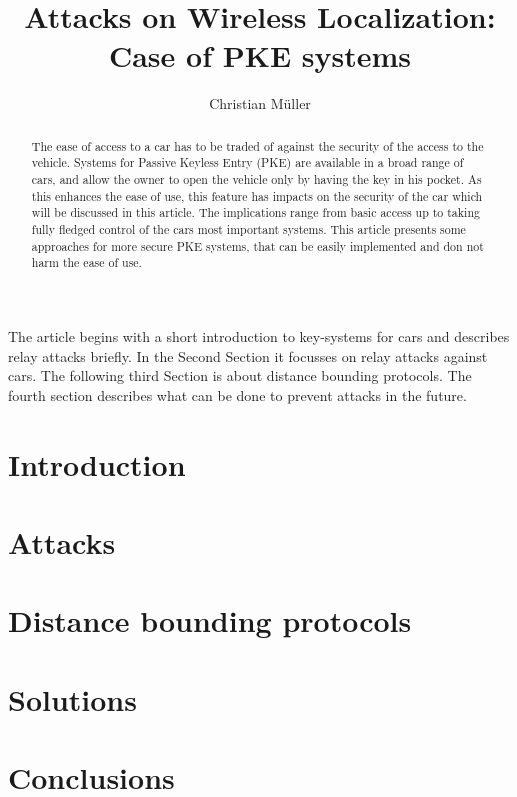 \documentclass[a4paper]{IEEEtran}
\title{Attacks on Wireless Localization:\\Case of PKE systems}
\author{Christian Müller}
\begin{document}
\maketitle

\setcounter{topnumber}{1}
\setcounter{bottomnumber}{0}
\setcounter{totalnumber}{0}

\begin{abstract}
The ease of access to a car has to be traded of against the security of the
access to the vehicle.
Systems for Passive Keyless Entry (PKE) are available in a broad range of cars,
and allow the owner to open the vehicle only by having the key in his pocket.
As this enhances the ease of use, this feature has impacts on the security of
the car which will be discussed in this article. The implications range from 
basic access up to taking fully fledged control of the cars most important
systems.
This article presents some approaches for more secure PKE systems,
that can be easily implemented and don not harm the ease of use.
\end{abstract}

The article begins with a short introduction to key-systems for cars and
describes relay attacks briefly.
In the Second Section it focusses on relay attacks against cars.
The following third Section is about distance bounding protocols.
The fourth section describes what can be done to prevent attacks in the future.

\section{Introduction}
	

\section{Attacks}
	

\section{Distance bounding protocols}
	

\section{Solutions}
\label{sec:solutions}
	


\section{Conclusions}
	

\newpage
\nocite{*}


\end{document}
